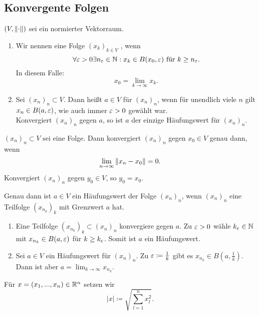 \subsection{Konvergente Folgen}
$ (V,\left\|\cdot\right\|) $ sei ein normierter Vektorraum.
\begin{definition}
	\bullshit
	\begin{enumerate}
		\item Wir nennen eine Folge $ (x_k)_{k\in V} $ , wenn \[ \forall\varepsilon>0\exists n_\varepsilon\in\mathbb{N}: x_k\in B(x_0,\varepsilon)\text{ f\"ur }k\geq n_\varepsilon. \]
		In diesem Falle:
		\[ x_0=\lim_{k\to\infty}x_k. \] 
		\item Sei $ (x_n)_n\subset V $. Dann hei\ss t $ a\in V $  f\"ur $ (x_n)_n $, wenn f\"ur unendlich viele $ n $ gilt $ x_n\in B(a,\varepsilon) $, wie auch immer $ \varepsilon>0 $ gew\"ahlt war.\\
		Konvergiert $ (x_n)_n $ gegen $ a $, so ist $ a $ der einzige H\"aufungswert f\"ur $ (x_n)_n $. 
	\end{enumerate}
\end{definition}
\begin{lemma}
	$ (x_n)_n\subset V $ sei eine Folge. Dann konvergiert $ (x_n)_n $ gegen $ x_0\in V $ genau dann, wenn
	\[ \lim_{n\to\infty}\left\|x_n-x_0\right\|=0. \]
	Konvergiert $ (x_n)_n $ gegen $ y_0\in V $, so $ y_0=x_0 $.
\end{lemma}
\begin{lemma}
	Genau dann ist $ a\in V $ ein H\"aufungswert der Folge $ (x_n)_n $, wenn $ (x_n)_n $ eine Teilfolge $ (x_{n_k})_k $ mit Grenzwert $ a $ hat.
\end{lemma}
\begin{beweis}
	\begin{enumerate}
		\item Eine Teilfolge $ (x_{n_k})_k\subset (x_n)_n $ konvergiere gegen $ a $. Zu $ \varepsilon>0 $ w\"ahle $ k_\varepsilon\in\mathbb{N} $ mit $ x_{n_k}\in B(a,\varepsilon) $ f\"ur $ k\geq k_\varepsilon $. Somit ist $ a $ ein H\"aufungswert.
		\item Sei $ a\in V $ ein H\"aufungswert f\"ur $ (x_n)_n $. Zu $ \varepsilon\coloneqq\frac{1}{k} $ gibt es $ x_{n_k}\in B\left(a,\frac{1}{k}\right) $. Dann ist aber $ a=\lim_{k\to\infty}x_{n_k} $.  
	\end{enumerate}
\end{beweis}
\begin{bemerkung*}[Notation]
	F\"ur $ x=(x_1,...,x_n)\in\mathbb{R}^n $ setzen wir
	\[ |x|\coloneqq\sqrt{\sum_{l=1}^n x_l^2}. \]
\end{bemerkung*}
